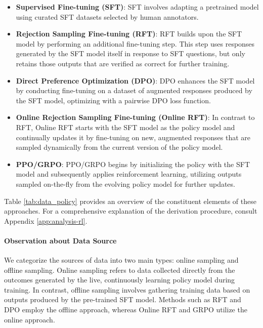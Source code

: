 \begin{itemize}[topsep=0pt]
\begin{itemize}[topsep=0pt]
\begin{itemize}
    \item  \textbf{Supervised Fine-tuning (SFT)}: SFT involves adapting a pretrained model using curated SFT datasets selected by human annotators.
    \item \textbf{Rejection Sampling Fine-tuning (RFT)}: RFT builds upon the SFT model by performing an additional fine-tuning step. This step uses responses generated by the SFT model itself in response to SFT questions, but only retains those outputs that are verified as correct for further training.
    \item \textbf{Direct Preference Optimization (DPO)}: DPO enhances the SFT model by conducting fine-tuning on a dataset of augmented responses produced by the SFT model, optimizing with a pairwise DPO loss function.
    \item \textbf{Online Rejection Sampling Fine-tuning (Online RFT)}: In contrast to RFT, Online RFT starts with the SFT model as the policy model and continually updates it by fine-tuning on new, augmented responses that are sampled dynamically from the current version of the policy model.
    \item \textbf{PPO/GRPO}: PPO/GRPO begins by initializing the policy with the SFT model and subsequently applies reinforcement learning, utilizing outputs sampled on-the-fly from the evolving policy model for further updates.
\end{itemize}

Table \ref{tab:data_policy} provides an overview of the constituent elements of these approaches. For a comprehensive explanation of the derivation procedure, consult Appendix \ref{app:analysis-rl}.

\paragraph{Observation about Data Source} We categorize the sources of data into two main types: online sampling and offline sampling. Online sampling refers to data collected directly from the outcomes generated by the live, continuously learning policy model during training. In contrast, offline sampling involves gathering training data based on outputs produced by the pre-trained SFT model. Methods such as RFT and DPO employ the offline approach, whereas Online RFT and GRPO utilize the online approach.


\end{itemize}
\end{itemize}
